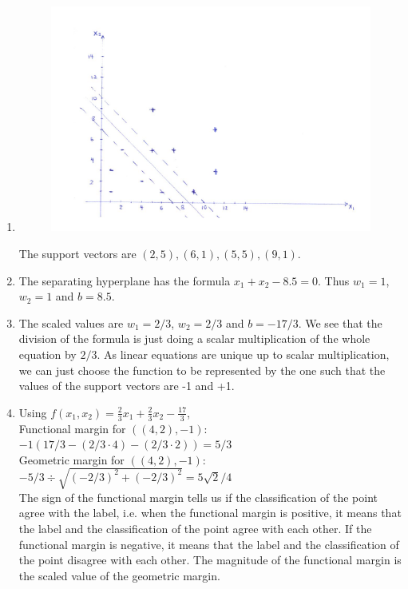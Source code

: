 \documentclass[a4paper,10pt]{article}
\theoremstyle{definition}
\begin{document}
\begin{enumerate}
\item
\begin{figure}[h]
\centering
\includegraphics[width=\textwidth]{svm.png}
\end{figure}
The support vectors are $(2,5),(6,1),(5,5),(9,1)$.

\item The separating hyperplane has the formula $x_1+x_2 -8.5=0$. Thus $w_1=1$, $w_2=1$ and $b=8.5$.

\item The scaled values are $w_1 = 2/3$, $w_2=2/3$ and $b=-17/3$. We see that the division of the formula is just doing a scalar multiplication of the whole equation by $2/3$. As linear equations are unique up to scalar multiplication, we can just choose the function to be represented by the one such that the values of the support vectors are -1 and +1.


\item 
Using $f(x_1,x_2) = \frac{2}{3}x_1+\frac{2}{3}x_2-\frac{17}{3}$, \\
Functional margin for $((4,2),-1)$: $-1(17/3-(2/3\cdot 4)-(2/3 \cdot 2))=5/3$\\
Geometric margin for $((4,2),-1)$: $-5/3\div \sqrt{(-2/3)^2+(-2/3)^2} = 5\sqrt{2}/4$\\

The sign of the functional margin tells us if the classification of the point agree with the label, i.e. when the functional margin is positive, it means that the label and the classification of the point agree with each other. If the functional margin is negative, it means that the label and the classification of the point disagree with each other. The magnitude of the functional margin is the scaled value of the geometric margin.
\end{enumerate}
\end{document}

